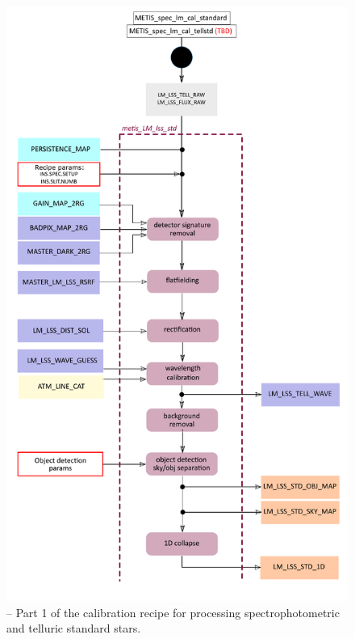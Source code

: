 \begin{figure}[ht]
  \centering
  \includegraphics[width=0.4\textheight]{figures/metis_lm_lss_std_v0.81_part_1.pdf}
  \caption[Recipe: ]{ --
    Part 1 of the calibration recipe for processing spectrophotometric and telluric standard stars.}
  \label{Fig:rec_lm_lss_flux1}
\end{figure}
